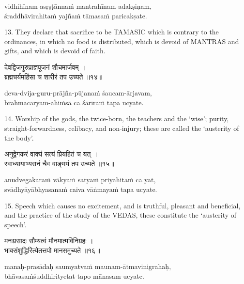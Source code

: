 \begin{transliteration}
vidhihīnam-asṛṣṭānnaṁ mantrahīnam-adakṣiṇam, \\
śraddhāvirahitaṁ yajñaṁ tāmasaṁ paricakṣate.
\end{transliteration}

13. They declare that sacrifice to be TAMASIC which is contrary to the
ordinances, in which no food is distributed, which is devoid of MANTRAS and
gifts, and which is devoid of faith.

\begin{gitaverse}
देवद्विजगुरुप्राज्ञपूजनं शौचमार्जवम् । \\
ब्रह्मचर्यमहिंसा च शारीरं तप उच्यते ॥१४॥
\end{gitaverse}

\begin{transliteration}
deva-dvija-guru-prājña-pūjanaṁ śaucam-ārjavam, \\
brahmacaryam-ahiṁsā ca śārīraṁ tapa ucyate.
\end{transliteration}

14. Worship of the gods, the twice-born, the teachers and the `wise'; purity,
straight-forwardness, celibacy, and non-injury; these are called the `austerity
of the body'.

\begin{gitaverse}
अनुद्वेगकरं वाक्यं सत्यं प्रियहितं च यत् । \\
स्वाध्यायाभ्यसनं चैव वाङ्मयं तप उच्यते ॥१५॥
\end{gitaverse}

\begin{transliteration}
anudvegakaraṁ vākyaṁ satyaṁ priyahitaṁ ca yat, \\
svādhyāyābhyasanaṁ caiva vāṅmayaṁ tapa ucyate.
\end{transliteration}

15. Speech which causes no excitement, and is truthful, pleasant and
beneficial, and the practice of the study of the VEDAS, these constitute the
`austerity of speech'.

\begin{gitaverse}
मनःप्रसादः सौम्यत्वं मौनमात्मविनिग्रहः । \\
भावसंशुद्धिरित्येतत्तपो मानसमुच्यते ॥१६॥
\end{gitaverse}

\begin{transliteration}
manaḥ-prasādaḥ saumyatvaṁ maunam-ātmavinigrahaḥ, \\
bhāvasaṁśuddhirityetat-tapo mānasam-ucyate.
\end{transliteration}

